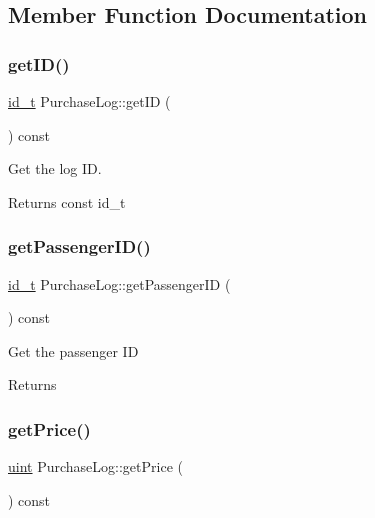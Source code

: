 \subsection{Member Function Documentation}
\mbox{\label{classPurchaseLog_abf4047c704b4f0525f3bd75cf977064d}} 
\subsubsection{\texorpdfstring{get\+I\+D()}{getID()}}
{\footnotesize\ttfamily \mbox{\hyperlink{project__utils_8h_a8f3a969054ad2200720b96e7e23dd4e1}{id\+\_\+t}} Purchase\+Log\+::get\+ID (\begin{DoxyParamCaption}{ }\end{DoxyParamCaption}) const}



Get the log ID. 

\begin{DoxyReturn}{Returns}
const id\+\_\+t 
\end{DoxyReturn}
\mbox{\label{classPurchaseLog_a46f469bc497e4b42dc8276e5608f7ade}} 
\subsubsection{\texorpdfstring{get\+Passenger\+I\+D()}{getPassengerID()}}
{\footnotesize\ttfamily \mbox{\hyperlink{project__utils_8h_a8f3a969054ad2200720b96e7e23dd4e1}{id\+\_\+t}} Purchase\+Log\+::get\+Passenger\+ID (\begin{DoxyParamCaption}{ }\end{DoxyParamCaption}) const}

Get the passenger ID

\begin{DoxyReturn}{Returns}

\end{DoxyReturn}
\mbox{\label{classPurchaseLog_aca334b2dea62a89d28daea66972f7972}} 
\subsubsection{\texorpdfstring{get\+Price()}{getPrice()}}
{\footnotesize\ttfamily \mbox{\hyperlink{project__utils_8h_a91ad9478d81a7aaf2593e8d9c3d06a14}{uint}} Purchase\+Log\+::get\+Price (\begin{DoxyParamCaption}{ }\end{DoxyParamCaption}) const}


